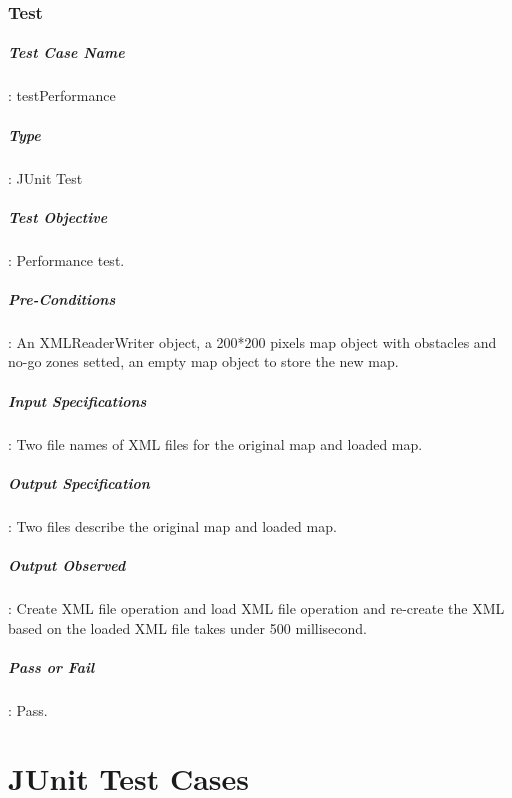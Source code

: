 \documentclass[12pt, a4paper]{report}
\begin{document}
\subsection{Test }
\paragraph{Test Case Name}: testPerformance
\paragraph{Type}: JUnit Test
\paragraph{Test Objective}: Performance test.
\paragraph{Pre-Conditions}: An XMLReaderWriter object, a 200*200 pixels map object with obstacles and no-go zones setted, an empty map object to store the new map.
\paragraph{Input Specifications}: Two file names of XML files for the original map and loaded map.
\paragraph{Output Specification}: Two files describe the original map and loaded map.
\paragraph{Output Observed}: Create XML file operation and load XML file operation and re-create the XML based on the loaded XML file takes under 500 millisecond.
\paragraph{Pass or Fail}: Pass.



\newpage
\appendix
\chapter{JUnit Test Cases} %
\label{cha:junit_test_cases}
\end{document}
